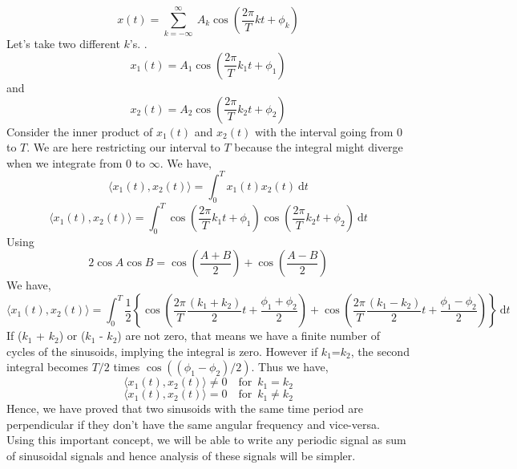           \begin{equation*}x(t) = \sum_{k=-\infty}^{\infty}\ A_k\cos (\frac{2\pi}{T}kt + \phi_k)\end{equation*}
          Let's take two different $k$'s.
.  \begin{equation*}
x_1 (t) = A_1 \cos (\frac{2\pi}{T}k_1t + \phi_1)
\end{equation*}
           and \begin{equation*}
x_2 (t) = A_2 \cos (\frac{2\pi}{T}k_2t + \phi_2)
\end{equation*}
          Consider the inner product of $x_1(t)$ and $x_2(t)$ with the interval going from $0$ to $T$. We are here restricting our interval to $T$ because the integral might diverge when we integrate from $0$ to $\infty$. We have,
           \begin{equation*}\langle x_1(t),x_2(t) \rangle = \int_{0}^{T} \! x_1(t)x_2(t) \ \mathrm{d}t\end{equation*}
           \begin{equation*}\langle x_1 (t),x_2 (t) \rangle = \int_{0}^{T} \! \cos (\frac{2\pi}{T}k_1t + \phi_1) \cos (\frac{2\pi}{T}k_2t + \phi_2) \ \mathrm{d}t\end{equation*}
           Using 
          \begin{equation*} 2\cos A \cos B = \cos(\frac{A+B}{2}) + \cos(\frac{A-B}{2})\end{equation*}
          We have,
          \begin{equation*}\langle x_1 (t),x_2 (t) \rangle = \int_{0}^{T} \! \frac{1}{2} \left\lbrace \cos (\frac{2\pi}{T}\frac{(k_1+k_2)}{2}t + \frac{\phi_1+\phi_2}{2}) + \cos (\frac{2\pi}{T}\frac{(k_1-k_2)}{2}t + \frac{\phi_1-\phi_2}{2}) \right\rbrace \ \mathrm{d}t \end{equation*}
                If ($k_1$ + $k_2$) or ($k_1$ - $k_2$) are not zero, that means we have a finite number of cycles of the sinusoids, implying the integral is zero. However if $k_1$=$k_2$, the second integral becomes $T/2$ times $\cos ((\phi_1-\phi_2)/2)$.
                Thus we have,
            \begin{equation*} \langle x_1 (t),x_2 (t) \rangle  \neq 0	\enspace \enspace	\text{for} \enspace k_1 = k_2\end{equation*}
            \begin{equation*} \langle x_1 (t),x_2 (t) \rangle = 0	\enspace \enspace		\text{for} \enspace k_1 \neq k_2\end{equation*}
                Hence, we have proved that two sinusoids with the same time period are perpendicular if they don't have the same angular frequency and vice-versa. Using this important concept, we will be able to write any periodic signal as sum of sinusoidal signals and hence analysis of these signals will be simpler.

